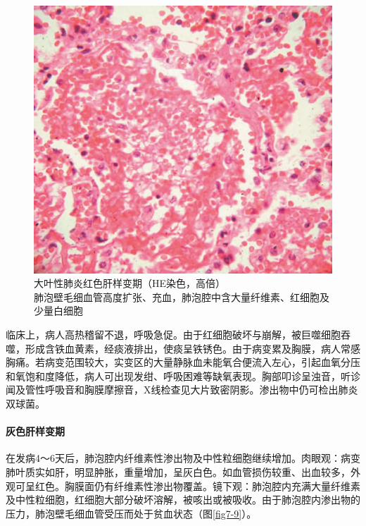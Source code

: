 \begin{figure}[!htbp]
 \centering
 \includegraphics{./images/Image00117.jpg}
 \captionsetup{justification=centering}
 \caption{大叶性肺炎红色肝样变期（HE染色，高倍）\\ {\small 肺泡壁毛细血管高度扩张、充血，肺泡腔中含大量纤维素、红细胞及少量白细胞}}
\label{fig7-8}
  \end{figure}

临床上，病人高热稽留不退，呼吸急促。由于红细胞破坏与崩解，被巨噬细胞吞噬，形成含铁血黄素，经痰液排出，使痰呈铁锈色。由于病变累及胸膜，病人常感胸痛。若病变范围较大，实变区的大量静脉血未能氧合便流入左心，引起血氧分压和氧饱和度降低，病人可出现发绀、呼吸困难等缺氧表现。胸部叩诊呈浊音，听诊闻及管性呼吸音和胸膜摩擦音，X线检查见大片致密阴影。渗出物中仍可检出肺炎双球菌。

\paragraph{灰色肝样变期}
在发病4～6天后，肺泡腔内纤维素性渗出物及中性粒细胞继续增加。肉眼观：病变肺叶质实如肝，明显肿胀，重量增加，呈灰白色。如血管损伤较重、出血较多，外观可呈红色。胸膜面仍有纤维素性渗出物覆盖。镜下观：肺泡腔内充满大量纤维素及中性粒细胞，红细胞大部分破坏溶解，被咳出或被吸收。由于肺泡腔内渗出物的压力，肺泡壁毛细血管受压而处于贫血状态（图\ref{fig7-9}）。

